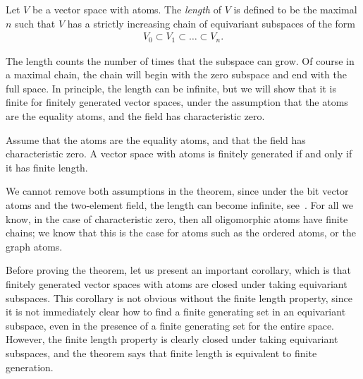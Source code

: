 \begin{definition}
    [Length] Let $V$ be a vector space with atoms. The \emph{length} of $V$ is defined to be the maximal $n$ such that $V$ has a strictly increasing chain of equivariant subspaces of the form 
    \begin{align*}
    V_0 \subset V_1 \subset \ldots \subset V_n.
    \end{align*}
\end{definition}

The length counts the number of times that the subspace can grow. Of course in a maximal chain, the chain will begin with the zero subspace and end with the full space. In principle, the length can be infinite, but we will show that it is finite for finitely generated vector spaces, under the  assumption that the atoms are the equality atoms, and the field has  characteristic zero. 








\begin{theorem}\label{thm:finite-length}
    Assume that the atoms are the equality atoms, and that the field has characteristic zero. A vector space with atoms is finitely generated if and only if it has finite length. 
\end{theorem}

 We cannot remove both assumptions in the theorem, since under the bit vector atoms and the two-element field, the length can become infinite, see~\cite[Section 4.4]{orbitFiniteVectorTheoretics}. For all we know, in the case of characteristic zero, then all oligomorphic atoms have finite chains; we know that this is the case for atoms such as the ordered atoms, or the graph atoms. 

Before proving the theorem, let us present an  important corollary, which is that finitely generated vector spaces with atoms are closed under taking equivariant subspaces. This corollary is not obvious without the finite length property, since it is not immediately clear how to find a finite generating set in an equivariant subspace, even in the presence of a finite generating set for the entire space. However, the finite  length property is clearly  closed under taking equivariant subspaces, and the theorem says that finite length is equivalent to finite generation. 





